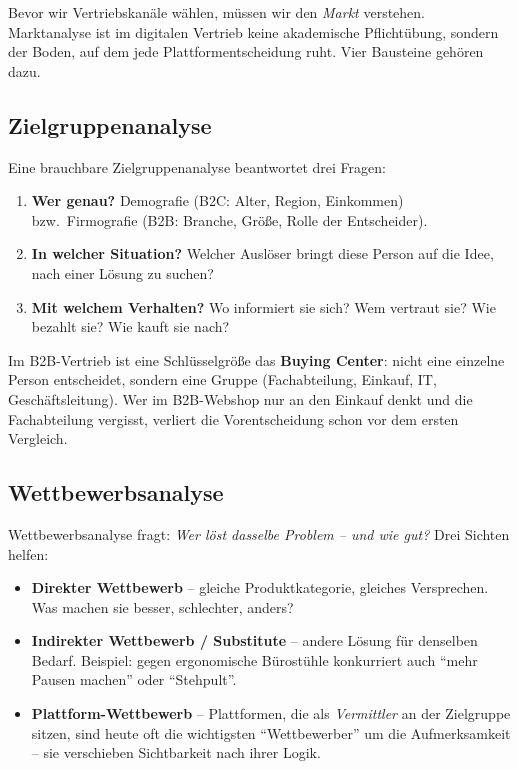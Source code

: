 \documentclass[11pt,a4paper,oneside]{article}
\newcommand{\fachbegriff}[1]{\textbf{#1}}
\begin{document}
Bevor wir Vertriebskanäle wählen, müssen wir den \emph{Markt} verstehen. Marktanalyse ist im digitalen Vertrieb keine akademische Pflichtübung, sondern der Boden, auf dem jede Plattformentscheidung ruht. Vier Bausteine gehören dazu.

\subsection{Zielgruppenanalyse}

Eine brauchbare Zielgruppenanalyse beantwortet drei Fragen:

\begin{enumerate}
  \item \textbf{Wer genau?} Demografie (B2C: Alter, Region, Einkommen) bzw.\ Firmografie (B2B: Branche, Größe, Rolle der Entscheider).
  \item \textbf{In welcher Situation?} Welcher Auslöser bringt diese Person auf die Idee, nach einer Lösung zu suchen?
  \item \textbf{Mit welchem Verhalten?} Wo informiert sie sich? Wem vertraut sie? Wie bezahlt sie? Wie kauft sie nach?
\end{enumerate}

Im B2B-Vertrieb ist eine Schlüsselgröße das \fachbegriff{Buying Center}: nicht eine einzelne Person entscheidet, sondern eine Gruppe (Fachabteilung, Einkauf, IT, Geschäftsleitung). Wer im B2B-Webshop nur an den Einkauf denkt und die Fachabteilung vergisst, verliert die Vorentscheidung schon vor dem ersten Vergleich.

\subsection{Wettbewerbsanalyse}

Wettbewerbsanalyse fragt: \emph{Wer löst dasselbe Problem -- und wie gut?} Drei Sichten helfen:

\begin{itemize}
  \item \textbf{Direkter Wettbewerb} -- gleiche Produktkategorie, gleiches Versprechen. Was machen sie besser, schlechter, anders?
  \item \textbf{Indirekter Wettbewerb / Substitute} -- andere Lösung für denselben Bedarf. Beispiel: gegen ergonomische Bürostühle konkurriert auch ``mehr Pausen machen'' oder ``Stehpult''.
  \item \textbf{Plattform-Wettbewerb} -- Plattformen, die als \emph{Vermittler} an der Zielgruppe sitzen, sind heute oft die wichtigsten ``Wettbewerber'' um die Aufmerksamkeit -- sie verschieben Sichtbarkeit nach ihrer Logik.
\end{itemize}
\end{document}
